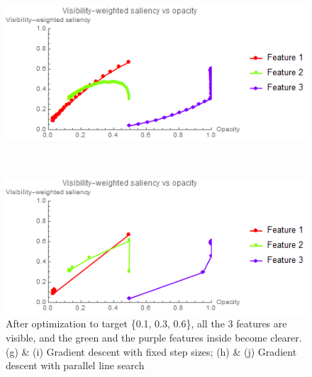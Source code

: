 \begin{figure}
	\begin{minipage}{.49\textwidth}
		\includegraphics[width=1\linewidth]{images/CT-Knee_naive_saliencyopacity_fixed}
		\subcaption{}
	\end{minipage}~
	\begin{minipage}{.49\textwidth}
		\includegraphics[width=1\linewidth]{images/CT-Knee_naive_saliencyopacity_parallelsearch}
		\subcaption{}
	\end{minipage}
	\caption[After optimization to target \{0.1, 0.3, 0.6\}, all the 3 features are visible, and the green and the purple features inside become clearer.]{After optimization to target \{0.1, 0.3, 0.6\}, all the 3 features are visible, and the green and the purple features inside become clearer. (g) \& (i) Gradient descent with fixed step sizes; (h) \& (j) Gradient descent with parallel line search}
	\label{fig:CT-Knee_naive_optimized}
\end{figure}


